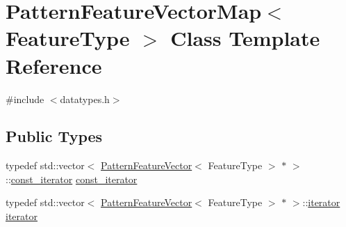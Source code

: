 \hypertarget{classPatternFeatureVectorMap}{}\section{Pattern\+Feature\+Vector\+Map$<$ Feature\+Type $>$ Class Template Reference}
\label{classPatternFeatureVectorMap}


{\ttfamily \#include $<$datatypes.\+h$>$}

\subsection*{Public Types}
\begin{DoxyCompactItemize}
\item 
typedef std\+::vector$<$ \hyperlink{classPatternFeatureVector}{Pattern\+Feature\+Vector}$<$ Feature\+Type $>$ $\ast$ $>$\+::\hyperlink{classPatternFeatureVectorMap_ae7d2f49b99e49834acbc799a0660cb18}{const\+\_\+iterator} \hyperlink{classPatternFeatureVectorMap_ae7d2f49b99e49834acbc799a0660cb18}{const\+\_\+iterator}
\item 
typedef std\+::vector$<$ \hyperlink{classPatternFeatureVector}{Pattern\+Feature\+Vector}$<$ Feature\+Type $>$ $\ast$ $>$\+::\hyperlink{classPatternFeatureVectorMap_a1c80bb683efdee17443a5b951412ddd3}{iterator} \hyperlink{classPatternFeatureVectorMap_a1c80bb683efdee17443a5b951412ddd3}{iterator}
\end{DoxyCompactItemize}
